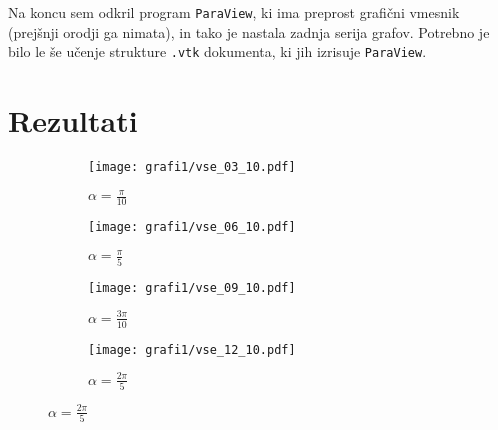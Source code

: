 \documentclass[12pt, a4paper]{article}
\begin{document}
Na koncu sem odkril program \texttt{ParaView}, ki ima preprost grafični vmesnik (prejšnji orodji ga nimata), in tako je nastala zadnja serija grafov. Potrebno je bilo le še učenje strukture \texttt{.vtk} dokumenta, ki jih izrisuje \texttt{ParaView}.

\FloatBarrier
\pagebreak

\section{Rezultati}
\FloatBarrier
\begin{figure}[h]
  \centering
  \begin{subfigure}[b]{0.49\textwidth}
    \centering
    \texttt{[image: grafi1/vse\_03\_10.pdf]}
    \caption{$\alpha = \frac{\pi}{10}$}
    \label{graf}
  \end{subfigure}
  \begin{subfigure}[b]{0.49\textwidth}
    \centering
    \texttt{[image: grafi1/vse\_06\_10.pdf]}
    \caption{$\alpha = \frac{\pi}{5}$}
    \label{graf}
  \end{subfigure}
  \begin{subfigure}[b]{0.49\textwidth}
    \centering
    \texttt{[image: grafi1/vse\_09\_10.pdf]}
    \caption{$\alpha = \frac{3\pi}{10}$}
    \label{graf}
  \end{subfigure}
  \begin{subfigure}[b]{0.49\textwidth}
    \centering
    \texttt{[image: grafi1/vse\_12\_10.pdf]}
    \caption{$\alpha = \frac{2\pi}{5}$}
    \label{graf}
  \end{subfigure}
\end{figure}
\end{document}
